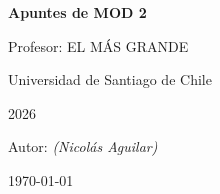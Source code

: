 \documentclass[12pt, a4paper, spanish]{article}
\theoremstyle{definition}
\theoremstyle{plain}
\theoremstyle{remark}
\begin{document}
\begin{titlepage}
  \centering
  \vspace*{2cm}
  {\LARGE\bfseries Apuntes de MOD 2\par}
    \vspace{0.5cm}
  {\large Profesor: EL MÁS GRANDE\par}
  \vspace{0.3cm}
  \vspace{0.5cm}
  {\large Universidad de Santiago de Chile\par}
  \vspace{0.3cm}
  {\large 2026\par}
  \vfill
  {\normalsize Autor: \textit{(Nicolás Aguilar)}\par}
  \vspace{0.5cm}
  {\small \today\par}
\end{titlepage}

\tableofcontents
\newpage


% 
% 
% 
\end{document}
